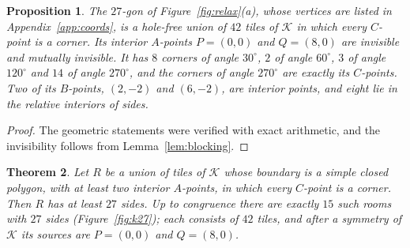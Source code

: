 \documentclass[11pt,a4paper]{article}
\theoremstyle{plain}
\newtheorem{theorem}{Theorem}[section]
\newtheorem{proposition}[theorem]{Proposition}
\theoremstyle{definition}
\theoremstyle{remark}
\newcommand{\K}{\mathcal{K}}
\newcommand{\dg}{^\circ}
\numberwithin{equation}{section}
\begin{document}
\begin{proposition}\label{prop:27}
The $27$-gon of Figure~\textup{\ref{fig:relax}(a)}, whose vertices are listed in Appendix~\textup{\ref{app:coords}}, is a hole-free union of $42$ tiles of $\K$ in which every $C$-point is a corner. Its interior $A$-points $P=(0,0)$ and $Q=(8,0)$ are invisible and mutually invisible. It has $8$ corners of angle $30\dg$, $2$ of angle $60\dg$, $3$ of angle $120\dg$ and $14$ of angle $270\dg$, and the corners of angle $270\dg$ are exactly its $C$-points. Two of its $B$-points, $(2,-2)$ and $(6,-2)$, are interior points, and eight lie in the relative interiors of sides.
\end{proposition}

\begin{proof}
The geometric statements were verified with exact arithmetic, and the invisibility follows from Lemma~\ref{lem:blocking}.
\end{proof}

\begin{theorem}\label{thm:min27}
Let $R$ be a union of tiles of $\K$ whose boundary is a simple closed polygon, with at least two interior $A$-points, in which every $C$-point is a corner. Then $R$ has at least $27$ sides. Up to congruence there are exactly $15$ such rooms with $27$ sides \textup{(}Figure~\textup{\ref{fig:k27}}\textup{)}; each consists of $42$ tiles, and after a symmetry of $\K$ its sources are $P=(0,0)$ and $Q=(8,0)$.
\end{theorem}
\end{document}
